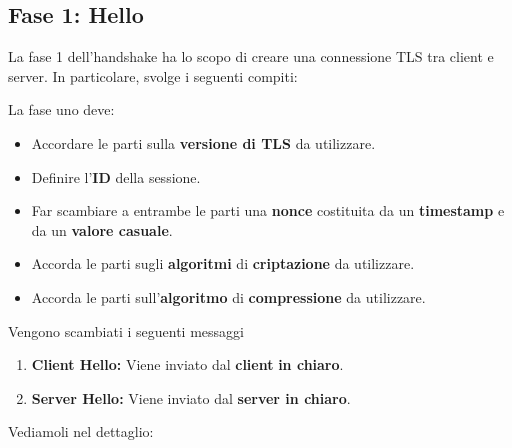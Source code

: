 \subsection{Fase 1: Hello}
La fase 1 dell’handshake ha lo scopo di creare una connessione TLS tra client e server. In particolare, svolge i seguenti compiti:
\begin{proposition}[Phase 1]
La fase uno deve:
\begin{itemize}
    \item Accordare le parti sulla \textbf{versione di TLS} da utilizzare.
    \item Definire l'\textbf{ID} della sessione.
    \item Far scambiare a entrambe le parti una \textbf{nonce} costituita da un \textbf{timestamp} e da un \textbf{valore casuale}.
    \item Accorda le parti sugli \textbf{algoritmi} di \textbf{criptazione} da utilizzare.
    \item Accorda le parti sull'\textbf{algoritmo} di \textbf{compressione} da utilizzare.
\end{itemize}
\end{proposition} 
Vengono scambiati i seguenti messaggi
\begin{definition}\label{def:phase1}
\begin{enumerate}
    \item \textbf{Client Hello:} Viene inviato dal \textbf{client} \textbf{in chiaro}.
    \item \textbf{Server Hello:} Viene inviato dal \textbf{server in chiaro}.
\end{enumerate}
\end{definition}
Vediamoli nel dettaglio:
